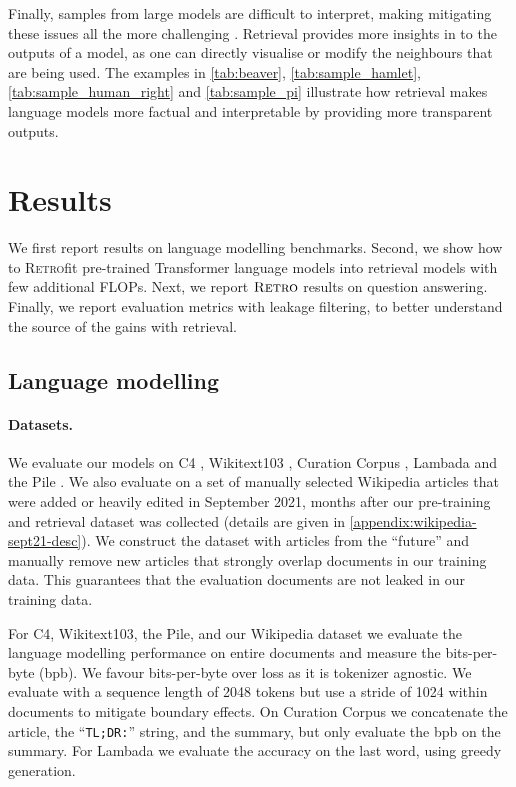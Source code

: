 \documentclass[11pt, a4paper, logo]{deepmind}
\newcommand{\retro}{\textsc{Retro}\xspace}
\newcommand{\retrofit}{\textsc{Retro}fit\xspace}
\begin{document}
Finally, samples from large models are difficult to interpret, making mitigating these issues all the more challenging \citep{belinkov-etal-2020-interpretability, jain-wallace-2019-attention}.
Retrieval provides more insights in to the outputs of a model, as one can directly visualise or modify the neighbours that are being used. The examples in \autoref{tab:beaver}, \ref{tab:sample_hamlet}, \ref{tab:sample_human_right} and \ref{tab:sample_pi} illustrate how retrieval makes language models more factual and interpretable by providing more transparent outputs.


\section{Results}

We first report results on language modelling benchmarks. Second, we show how to \retrofit pre-trained Transformer language models into retrieval models with few additional FLOPs. Next, we report $\retro$ results on question answering. Finally, we report evaluation metrics with leakage filtering, to better understand the source of the gains with retrieval.

\label{sec-results}
\subsection{Language modelling}
\label{subsec-scaling}

\paragraph{Datasets.}
We evaluate our models on C4 \citep{raffel2019t5}, Wikitext103 \citep{merity2016pointer}, Curation Corpus \citep{curationcorpusbase2020}, Lambada \citep{paperno2016lambada} and the Pile \citep{pile}. 
We also evaluate on a set of manually selected Wikipedia articles that were added or heavily edited in September 2021, months after our pre-training and retrieval dataset was collected (details are given in \autoref{appendix:wikipedia-sept21-desc}).
We construct the dataset with articles from the ``future'' and manually remove new articles that strongly overlap documents in our training data. This guarantees that the evaluation documents are not leaked in our training data.

For C4, Wikitext103, the Pile, and our Wikipedia dataset we evaluate the language modelling performance on entire documents and measure the bits-per-byte (bpb). 
We favour bits-per-byte over loss as it is tokenizer agnostic.
We evaluate with a sequence length of 2048 tokens but use a stride of 1024 within documents to mitigate boundary effects.
On Curation Corpus we concatenate the article, the ``\texttt{TL;DR:}'' string, and the summary, but only evaluate the bpb on the summary.
For Lambada we evaluate the accuracy on the last word, using greedy generation.
\end{document}
